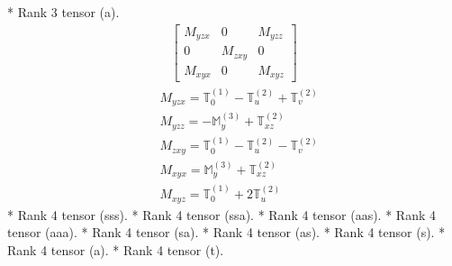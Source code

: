 \documentclass[fleqn,8pt,landscape]{jsarticle}
\begin{document}
* Rank 3 tensor (a).
\begin{align*}
\begin{bmatrix} M_{yzx} & 0 & M_{yzz} \\ 0 & M_{zxy} & 0 \\ M_{xyx} & 0 & M_{xyz} \end{bmatrix}
\end{align*}
\begin{align*}
& M_{yzx} = \mathbb{T}_{0}^{(1)} - \mathbb{T}_{u}^{(2)} + \mathbb{T}_{v}^{(2)} \\
& M_{yzz} = - \mathbb{M}_{y}^{(3)} + \mathbb{T}_{xz}^{(2)} \\
& M_{zxy} = \mathbb{T}_{0}^{(1)} - \mathbb{T}_{u}^{(2)} - \mathbb{T}_{v}^{(2)} \\
& M_{xyx} = \mathbb{M}_{y}^{(3)} + \mathbb{T}_{xz}^{(2)} \\
& M_{xyz} = \mathbb{T}_{0}^{(1)} + 2 \mathbb{T}_{u}^{(2)}
\end{align*}
* Rank 4 tensor (sss).
* Rank 4 tensor (ssa).
* Rank 4 tensor (aas).
* Rank 4 tensor (aaa).
* Rank 4 tensor (sa).
* Rank 4 tensor (as).
* Rank 4 tensor (s).
* Rank 4 tensor (a).
* Rank 4 tensor (t).
\end{document}
